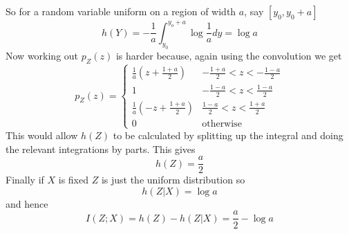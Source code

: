 \documentclass[12pt]{article}
\begin{document}
So for a random variable uniform on a region of width $a$, say $[y_0,y_0+a]$
\begin{equation}
  h(Y)=-\frac{1}{a}\int_{y_0}^{y_o+a}\log{\frac{1}{a}}dy=\log{a}
\end{equation}
Now working out $p_Z(z)$ is harder because, again using the convolution we get
\begin{equation}
  p_Z(z)=\left\{\begin{array}{ll}
  \frac{1}{a}\left(z+\frac{1+a}{2}\right)&-\frac{1+a}{2}<z<-\frac{1-a}{2}\\
  1                                       &-\frac{1-a}{2}<z<\frac{1-a}{2}\\
  \frac{1}{a}\left(-z+\frac{1+a}{2}\right)&\frac{1-a}{2}<z<\frac{1+a}{2}\\
  0&\mbox{otherwise}
  \end{array}\right.
\end{equation}
This would allow $h(Z)$ to be calculated by splitting up the integral and doing the relevant integrations by parts. This gives
\begin{equation}
  h(Z)=\frac{a}{2}
\end{equation}
Finally if $X$ is fixed $Z$ is just the uniform distribution so
\begin{equation}
  h(Z|X)=\log{a}
\end{equation}
and hence
\begin{equation}
  I(Z;X)=h(Z)-h(Z|X)=\frac{a}{2}-\log{a}
\end{equation}
\end{document}
